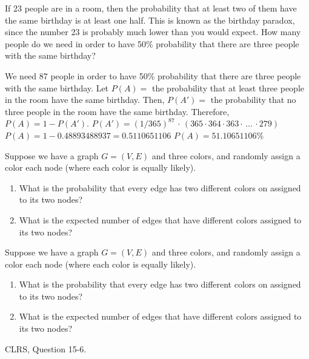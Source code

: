 \documentclass{article}
\author{Gavin Austin, George Engel, Troy Oster}
\date{due: 18 October 2019}
\begin{document}
\nextprob
If 23 people are in a room, then the probability that at least two of them have
the same birthday is at least one half.  This is known as the birthday paradox,
since the number 23 is probably much lower than you would expect.  How many
people do we need in order to have 50\% probability that there are three people
with the same birthday?

We need 87 people in order to have 50\% probability that there are three people with the same birthday.
\newline \newline Let $P(A) = $ the probability that at least three people in the room have the same birthday.
\newline Then, $P(A') = $ the probability that no three people in the room have the same birthday.
\newline Therefore, $P(A) = 1 - P(A')$.
\newline \newline $P(A') = (1/365)^{87} \,\cdot\, (365 \cdot 364 \cdot 363 \cdot \, ... \, \cdot 279)$
\newline $P(A) = 1 - 0.48893488937 = 0.5110651106$
\newline $P(A) = 51.10651106\%$


\nextprob
Suppose we have a graph $G=(V,E)$ and three colors, and randomly assign a color
each node (where each color is equally likely).
\begin{enumerate}
    \item What is the probability that every edge has two different colors on
        assigned to its two nodes?
    \item What is the expected number of edges that have different colors
        assigned to its two nodes?
\end{enumerate}

\nextprob
Suppose we have a graph $G=(V,E)$ and three colors, and randomly assign a color
each node (where each color is equally likely).
\begin{enumerate}
    \item What is the probability that every edge has two different colors on
        assigned to its two nodes?
    \item What is the expected number of edges that have different colors
        assigned to its two nodes?
\end{enumerate}

\nextprob
CLRS, Question 15-6.

\end{document}
